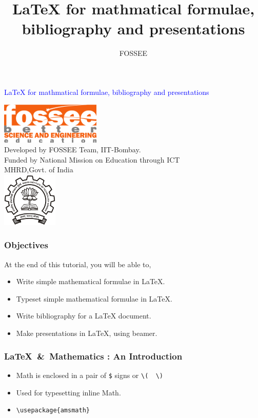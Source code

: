 \documentclass{beamer}
\title [{\LaTeX} for mathematics \& beyond] {{\LaTeX} for mathmatical formulae, bibliography and presentations}
\author {FOSSEE}
\begin{document}
\begin{frame}
  \begin{center}
    \vspace{12pt}
    \textcolor{blue}{\huge {\LaTeX} for mathmatical formulae, bibliography and presentations}
  \end{center}
  \vspace{18pt}
  \begin{center}
    \vspace{10pt}
    \includegraphics[scale=0.95]{../images/fossee-logo.png}\\
    \vspace{5pt}
    \scriptsize Developed by FOSSEE Team, IIT-Bombay. \\ 
    \scriptsize Funded by National Mission on Education through ICT\\
    \scriptsize  MHRD,Govt. of India\\
    \includegraphics[scale=0.30]{../images/iitb-logo.png}\\
  \end{center}
\end{frame}

\begin{frame}
  \frametitle{Objectives}
  \label{sec-2}
    At the end of this tutorial, you will be able to,
  \begin{itemize}
    \item Write simple mathematical formulae in {\LaTeX}.
    \item Typeset simple mathematical formulae in {\LaTeX}.
    \item Write bibliography for a LaTeX document.
    \item Make presentations in LaTeX, using beamer.
  \end{itemize}
\end{frame}

\begin{frame}[fragile]
  \frametitle{\LaTeX\ \&\ Mathematics : An Introduction}
  \begin{itemize}
  \item Math is enclosed in a pair of \lstinline{$} signs or %
    \lstinline+\(  \)+ 
  \item Used for typesetting inline Math. 
  \item \lstinline+\usepackage{amsmath}+
  \end{itemize}
\end{frame}
\end{document}
